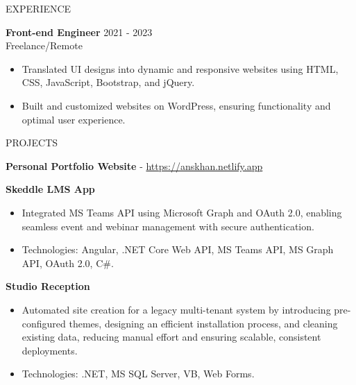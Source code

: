 \documentclass{resume} %
\begin{document}
\begin{rSection}{EXPERIENCE}
	
	\textbf{Front-end Engineer} \hfill 2021  - 2023\\
	Freelance/Remote  \hfill %
	\begin{itemize}
		\itemsep -3pt {} 
		\item Translated UI designs into dynamic and responsive websites using HTML, CSS, JavaScript, Bootstrap, and jQuery.
		
		\item Built and customized websites on WordPress, ensuring functionality and optimal user experience. \\
		
	\end{itemize}
	
	
	

  
\begin{rSection}{PROJECTS}
\vspace{-1.25em}
\item \textbf{Personal Portfolio Website}  - \href{https://anskhan.netlify.app}{https://anskhan.netlify.app}



\textbf {Skeddle LMS App} 
	\begin{itemize}
		\itemsep -5pt {}
		\item Integrated MS Teams API using Microsoft Graph and OAuth 2.0, enabling seamless event and webinar management with secure authentication.
		\item Technologies: Angular, .NET Core Web API, MS Teams API, MS Graph API, OAuth 2.0, C\#.
	\end{itemize}
  \textbf {Studio Reception} 
 \begin{itemize}
 	\itemsep -5pt {} 
 	\item Automated site creation for a legacy multi-tenant system by introducing pre-configured themes, 
 	designing an efficient installation process, and cleaning existing data, reducing manual effort and ensuring scalable, consistent deployments. 
 	\item Technologies: .NET, MS SQL Server, VB, Web Forms.
 \end{itemize}
 

\end{rSection}
\end{rSection}
\end{document}

